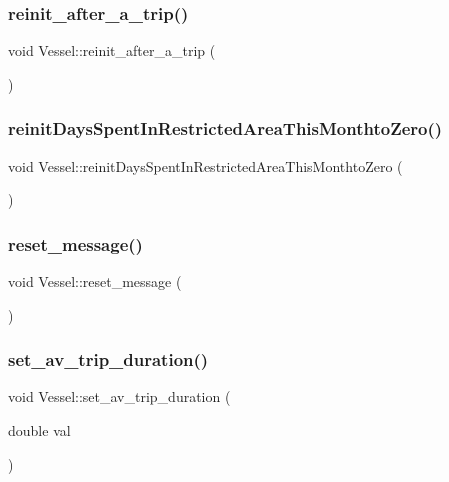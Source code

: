 \subsubsection{\texorpdfstring{reinit\_after\_a\_trip()}{reinit\_after\_a\_trip()}}
{\footnotesize\ttfamily void Vessel\+::reinit\+\_\+after\+\_\+a\+\_\+trip (\begin{DoxyParamCaption}{ }\end{DoxyParamCaption})}

\mbox{\label{class_vessel_a92e3c0d99cec3326a562eb4b0e89ff4a}} 
\subsubsection{\texorpdfstring{reinitDaysSpentInRestrictedAreaThisMonthtoZero()}{reinitDaysSpentInRestrictedAreaThisMonthtoZero()}}
{\footnotesize\ttfamily void Vessel\+::reinit\+Days\+Spent\+In\+Restricted\+Area\+This\+Monthto\+Zero (\begin{DoxyParamCaption}{ }\end{DoxyParamCaption})}

\mbox{\label{class_vessel_a0a776522dd340a5e213e039ff2fba42a}} 
\subsubsection{\texorpdfstring{reset\_message()}{reset\_message()}}
{\footnotesize\ttfamily void Vessel\+::reset\+\_\+message (\begin{DoxyParamCaption}{ }\end{DoxyParamCaption})}

\mbox{\label{class_vessel_a76f916eef7f3895b4fde20b47292c615}} 
\subsubsection{\texorpdfstring{set\_av\_trip\_duration()}{set\_av\_trip\_duration()}}
{\footnotesize\ttfamily void Vessel\+::set\+\_\+av\+\_\+trip\+\_\+duration (\begin{DoxyParamCaption}\item[{double}]{val }\end{DoxyParamCaption})}

